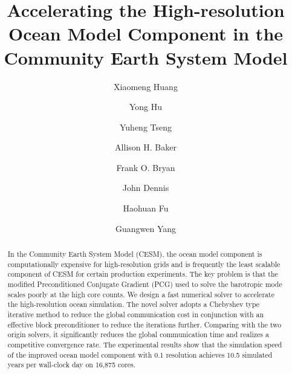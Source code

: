 \documentclass[gmd, manuscript]{copernicus}
\begin{document}
\linenumbers

\title{Accelerating the High-resolution Ocean Model Component in the Community Earth System Model}

\author[1,2]{Xiaomeng Huang}
\author[1]{Yong Hu}
\author[3]{Yuheng Tseng}
\author[3]{Allison H. Baker}
\author[3]{Frank O. Bryan}
\author[3]{John Dennis}
\author[1]{Haohuan Fu}
\author[1]{Guangwen Yang}




\received{}
\pubdiscuss{} %

\revised{}
\accepted{}
\published{}


\maketitle

\begin{abstract}
In the Community Earth System Model (CESM), the ocean model component is computationally expensive for high-resolution grids and is frequently the least scalable component of CESM for certain production experiments. The key problem is that the modified Preconditioned Conjugate Gradient (PCG) used to solve the barotropic mode scales poorly at the high core counts. We design a fast numerical solver to accelerate the high-resolution ocean simulation. The novel solver adopts a Chebyshev type iterative method to reduce the global communication cost in conjunction with an effective block preconditioner to reduce the iterations further. Comparing with the two origin solvers, it significantly reduces the global communication time and realizes a competitive convergence rate. The experimental results show that the simulation speed of the improved ocean model component with 0.1{\degree}  resolution achieves 10.5 simulated years per wall-clock day on 16,875 cores.
\end{abstract}
\end{document}
